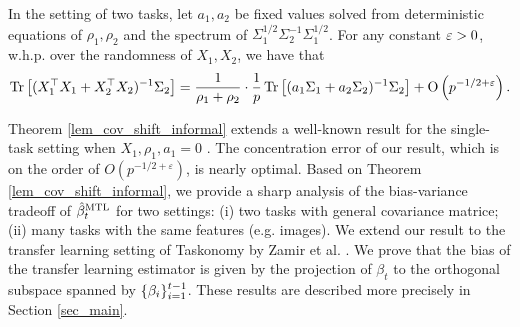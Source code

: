 \begin{theorem}[Informal]\label{lem_cov_shift_informal}
	In the setting of two tasks, let $a_1, a_2$ be fixed values solved from deterministic equations of $\rho_1, \rho_2$ and the spectrum of $\Sigma_1^{1/2}\Sigma_2^{-1}\Sigma_1^{1/2}$.
	For any constant ${\varepsilon}>0$, w.h.p. over the randomness of $X_1, X_2$, we have that
	\begin{align*}
		\operatorname{Tr}\left[(X_1^{\top}X_1 + X_2^{\top}X_2)^{-1}\Sigma_2\right] = \frac{1}{\rho_1+\rho_2}\cdot \frac1p\operatorname{Tr}\left[ (a_1 \Sigma_1 + a_2\Sigma_2)^{-1} \Sigma_2\right] +\operatorname{O}\left({p^{-1/2+\varepsilon}}\right).
	\end{align*}
\end{theorem}

Theorem \ref{lem_cov_shift_informal} extends a well-known result for the single-task setting when $X_1, \rho_1, a_1 = 0$ \cite{S07}.
The concentration error of our result, which is on the order of $O(p^{-1/2+\varepsilon})$, is nearly optimal.
Based on Theorem \ref{lem_cov_shift_informal}, we provide a sharp analysis of the bias-variance tradeoff of $\hat{\beta}_t^{\text{MTL}}$ for two settings:
(i) two tasks with general covariance matrice; (ii) many tasks with the same features (e.g. images).
We extend our result to the transfer learning
setting of Taskonomy by Zamir et al. \cite{ZSSGM18}.
We prove that the bias of the transfer learning estimator is given by the projection of $\beta_t$ to the orthogonal subspace spanned by $\{\beta_i\}_{i=1}^{t-1}$.
These results are described more precisely in Section \ref{sec_main}.

